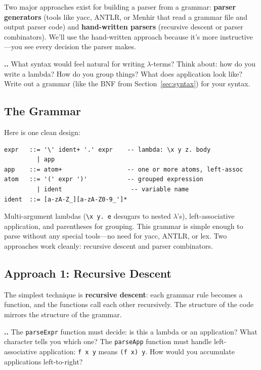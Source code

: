 \documentclass[11pt,a4paper]{article}
\newcounter{exercise}[section]
\renewcommand{\theexercise}{\thesection.\arabic{exercise}}
\theoremstyle{definition}
\newcommand{\lam}{\lambda}
\begin{document}
Two major approaches exist for building a parser from a grammar:
\textbf{parser generators} (tools like yacc, ANTLR, or Menhir that read a
grammar file and output parser code) and \textbf{hand-written parsers}
(recursive descent or parser combinators). We'll use the hand-written approach
because it's more instructive---you see every decision the parser makes.

\begin{exercisebox}
\textbf{\theexercise.}\; What syntax would feel natural for writing $\lam$-terms? Think about: how do you write a lambda? How do you group things? What does application look like? Write out a grammar (like the BNF from Section~\ref{sec:syntax}) for your syntax.
\end{exercisebox}

\subsection{The Grammar}

Here is one clean design:

\begin{verbatim}
expr   ::= '\' ident+ '.' expr    -- lambda: \x y z. body
         | app
app    ::= atom+                  -- one or more atoms, left-assoc
atom   ::= '(' expr ')'           -- grouped expression
         | ident                   -- variable name
ident  ::= [a-zA-Z_][a-zA-Z0-9_']*
\end{verbatim}

Multi-argument lambdas (\verb|\x y. e| desugars to nested $\lam$'s),
left-associative application, and parentheses for grouping. This grammar
is simple enough to parse without any special tools---no need for yacc, ANTLR,
or lex. Two approaches work cleanly: recursive descent and parser combinators.

\subsection{Approach 1: Recursive Descent}

The simplest technique is \textbf{recursive descent}: each grammar rule becomes
a function, and the functions call each other recursively. The structure of
the code mirrors the structure of the grammar.

\begin{exercisebox}
\textbf{\theexercise.}\; The \texttt{parseExpr} function must decide: is this a lambda or an application? What character tells you which one? The \texttt{parseApp} function must handle left-associative application: \texttt{f x y} means \texttt{(f x) y}. How would you accumulate applications left-to-right?
\end{exercisebox}
\end{document}
